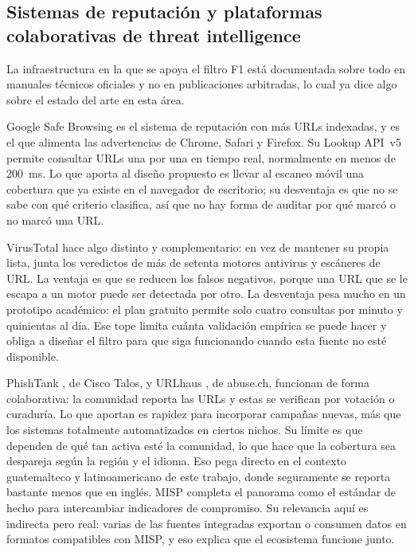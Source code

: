 \subsection{Sistemas de reputación y plataformas colaborativas de threat intelligence}

La infraestructura en la que se apoya el filtro F1 está documentada sobre todo en
manuales técnicos oficiales y no en publicaciones arbitradas, lo cual ya dice algo
sobre el estado del arte en esta área.

Google Safe Browsing \cite{google_safebrowsing} es el sistema de reputación con más
URLs indexadas, y es el que alimenta las advertencias de Chrome, Safari y Firefox. Su
Lookup API~v5 permite consultar URLs una por una en tiempo real, normalmente en menos
de 200~ms. Lo que aporta al diseño propuesto es llevar al escaneo móvil una cobertura
que ya existe en el navegador de escritorio; su desventaja es que no se sabe con qué
criterio clasifica, así que no hay forma de auditar por qué marcó o no marcó una
URL.

VirusTotal \cite{virustotal_apiv3} hace algo distinto y complementario: en vez de
mantener su propia lista, junta los veredictos de más de setenta motores antivirus y
escáneres de URL. La ventaja es que se reducen los falsos negativos, porque una URL que
se le escapa a un motor puede ser detectada por otro. La desventaja pesa mucho en un
prototipo académico: el plan gratuito permite solo cuatro consultas por minuto y
quinientas al día. Ese tope limita cuánta validación empírica se puede hacer y obliga a
diseñar el filtro para que siga funcionando cuando esta fuente no esté
disponible.

PhishTank \cite{phishtank_devinfo}, de Cisco Talos, y URLhaus \cite{urlhaus_api}, de
abuse.ch, funcionan de forma colaborativa: la comunidad reporta las URLs y estas se
verifican por votación o curaduría. Lo que aportan es rapidez para incorporar campañas
nuevas, más que los sistemas totalmente automatizados en ciertos nichos. Su límite es
que dependen de qué tan activa esté la comunidad, lo que hace que la cobertura sea
despareja según la región y el idioma. Eso pega directo en el contexto guatemalteco y
latinoamericano de este trabajo, donde seguramente se reporta bastante menos que en
inglés. MISP \cite{misp_project} completa el panorama como el estándar de hecho para
intercambiar indicadores de compromiso. Su relevancia aquí es indirecta pero real:
varias de las fuentes integradas exportan o consumen datos en formatos compatibles con
MISP, y eso explica que el ecosistema funcione junto.

